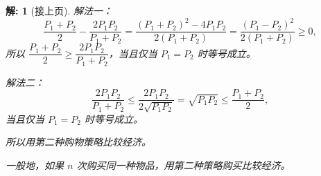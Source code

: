 \documentclass[aspectratio=169,13pt,fleqn,t] {beamer}
\newtheorem*{solve}{解:}
\begin{document}
\begin{frame}{}
	\begin{solve}[接上页]
		解法一：
		\[
		\frac{P_1+P_2}{2}-\frac{2P_1P_2}{P_1+P_2}
		=\frac{(P_1+P_2)^2-4P_1P_2}{2(P_1+P_2)}
		=\frac{(P_1-P_2)^2}{2(P_1+P_2)}\geq 0,
		\]
		所以 $\dfrac{P_1+P_2}{2}\geq \dfrac{2P_1P_2}{P_1+P_2}$，当且仅当 $P_1=P_2$ 时等号成立。
		
		解法二：
		\[
		\frac{2P_1P_2}{P_1+P_2}\leq \frac{2P_1P_2}{2\sqrt{P_1P_2}}=\sqrt{P_1P_2}\leq \frac{P_1+P_2}{2},
		\]
		当且仅当 $P_1=P_2$ 时等号成立。
		
		所以用第二种购物策略比较经济。
		
		一般地，如果 $n$ 次购买同一种物品，用第二种策略购买比较经济。
	\end{solve}
\end{frame}
\end{document}
